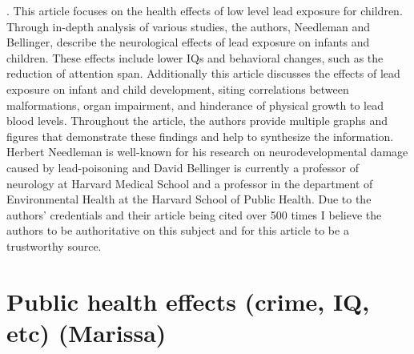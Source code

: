 \documentclass{article}
\begin{document}
\bigskip
{}. 
\bigskip
This article focuses on the health effects of low level lead exposure for children. Through in-depth analysis of various studies, the authors, Needleman and Bellinger, describe the neurological effects of lead exposure on infants and children. These effects include lower IQs and behavioral changes, such as the reduction of attention span. Additionally this article discusses the effects of lead exposure on infant and child development, siting correlations between malformations, organ impairment, and hinderance of physical growth to lead blood levels. Throughout the article, the authors provide multiple graphs and figures that demonstrate these findings and help to synthesize the information. Herbert Needleman is well-known for his research on neurodevelopmental damage caused by lead-poisoning and David Bellinger is currently a professor of neurology at Harvard Medical School and a professor in the department of Environmental Health at the Harvard School of Public Health. Due to the authors’ credentials and their article being cited over 500 times I believe the authors to be authoritative on this subject and for this article to be a trustworthy source. 

\section{Public health effects (crime, IQ, etc) (Marissa)}
\end{document}
